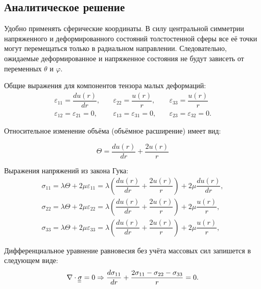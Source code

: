 \documentclass[a4paper,12pt]{article}	%
\let\DS     = \displaystyle
\def\Tens#1{{\underline{\underline{#1\hspace{-0.5mm}}}\hspace{0.5mm}}}
\newcommand{\Tens}[1]{\boldsymbol{\mathrm{#1}} {}}
\begin{document}
\subsection{Аналитическое решение}

\normalsize

Удобно применять сферические координаты. В силу центральной симметрии напряженного и деформированного состояний толстостенной сферы все её точки могут перемещаться только в радиальном направлении. Следовательно, ожидаемые деформированное и напряженное состояния не будут зависеть от переменных $\theta$ и $\varphi$.

Общие выражения для компонентов тензора малых деформаций:
\begin{equation}
    \begin{array}{lll}
        \DS \varepsilon_{11} = \dfrac{d u(r)}{dr}, &\quad \DS \varepsilon_{22} = \dfrac{u(r)}{r}, &\quad \DS \varepsilon_{33} = \dfrac{u(r)}{r}
        \\[3mm]
        \varepsilon_{12} = \varepsilon_{21} = 0, &\quad \DS \varepsilon_{13} = \varepsilon_{31} = 0, &\quad \DS \varepsilon_{23} = \varepsilon_{32} = 0.
    \end{array}
\end{equation}

Относительное изменение объёма (объёмное расширение) имеет вид:

\begin{equation}
    \DS \Theta=\dfrac{d u(r)}{dr}+\dfrac{2u(r)}{r}
\end{equation}

Выражения напряжений из закона Гука:
\begin{equation}\label{sigma_components}
    \begin{array}{l}
        \DS \sigma_{11}=\lambda\Theta+2\mu\varepsilon_{11}=\lambda\left(\dfrac{d u(r)}{dr}+\dfrac{2u(r)}{r}\right)+2\mu\dfrac{d u(r)}{dr},
        \\[3mm]
        \DS \sigma_{22}=\lambda\Theta+2\mu\varepsilon_{22}=\lambda\left(\dfrac{d u(r)}{dr}+\dfrac{2u(r)}{r}\right)+2\mu\dfrac{u(r)}{r},
        \\[3mm]
        \DS \sigma_{33}=\lambda\Theta+2\mu\varepsilon_{33}=\lambda\left(\dfrac{d u(r)}{dr}+\dfrac{2u(r)}{r}\right)+2\mu\dfrac{u(r)}{r},
    \end{array}
\end{equation}

Дифференциальное уравнение равновесия без учёта массовых сил запишется в следующем виде:
\begin{equation}\label{equilibrium_eq}
    \DS \nabla \cdot \Tens{\sigma}=0  \Rightarrow  \frac{d \sigma_{11}}{dr}+\dfrac{2\sigma_{11}-\sigma_{22}-\sigma_{33}}{r}=0.
\end{equation}
\end{document}
